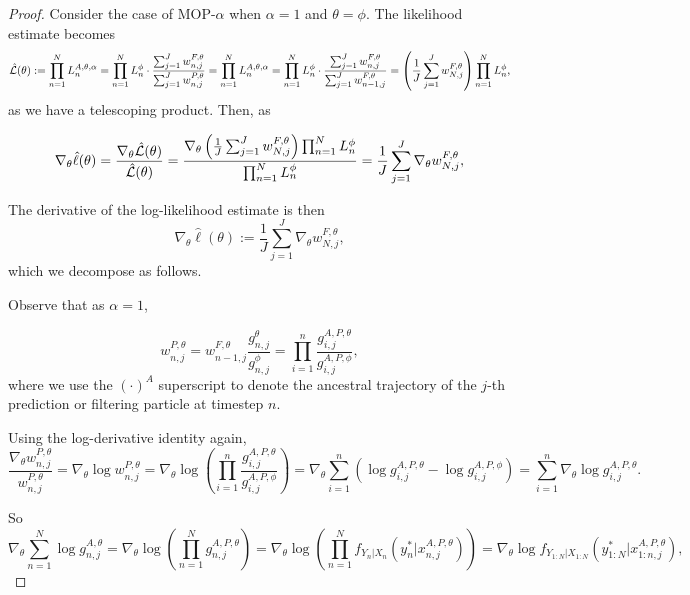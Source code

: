 \documentclass{article}
\begin{document}
\begin{proof}

    Consider the case of MOP-$\alpha$ when $\alpha=1$ and $\theta=\phi$. The likelihood estimate becomes
\begin{equation*}
    \hat{\mathcal{L}}(\theta) := \prod_{n=1}^N L_n^{A, \theta, \alpha} = \prod_{n=1}^N L_n^\phi \cdot \frac{\sum_{j=1}^J w_{n,j}^{F,\theta}}{\sum_{j=1}^J w_{n,j}^{P,\theta}}= \prod_{n=1}^N L_n^{A, \theta, \alpha} = \prod_{n=1}^N L_n^\phi \cdot \frac{\sum_{j=1}^J w_{n,j}^{F,\theta}}{\sum_{j=1}^J w_{n-1,j}^{F,\theta}} = \left(\frac{1}{J}\sum_{j=1}^J w_{N,j}^{F,\theta}\right) \prod_{n=1}^N L_n^\phi,
\end{equation*}
as we have a telescoping product. Then, as

$$\nabla_\theta \hat\ell(\theta) = \frac{\nabla_\theta \hat{\mathcal{L}}(\theta)}{\hat{\mathcal{L}}(\theta)} = \frac{\nabla_\theta\left(\frac{1}{J}\sum_{j=1}^J w_{N,j}^{F,\theta}\right) \prod_{n=1}^N L_n^\phi}{\prod_{n=1}^N L_n^\phi} =  \frac{1}{J}\sum_{j=1}^J \nabla_\theta w_{N,j}^{F,\theta},$$

The derivative of the log-likelihood estimate is then
\begin{equation*}
    \nabla_\theta \hat{\ell}(\theta) := \frac{1}{J}\sum_{j=1}^J \nabla_\theta w_{N,j}^{F,\theta},
\end{equation*}
which we decompose as follows.

Observe that as $\alpha=1$,

$$w_{n,j}^{P,\theta} = w_{n-1,j}^{F,\theta}\frac{g_{n,j}^\theta}{g_{n,j}^\phi} = \prod_{i=1}^n \frac{g_{i,j}^{A,P,\theta}}{g_{i,j}^{A,P,\phi}},$$
where we use the $(\cdot)^A$ superscript to denote the ancestral trajectory of the $j$-th prediction or filtering particle at timestep $n$.

Using the log-derivative identity again,
$$\frac{\nabla_\theta w_{n,j}^{P,\theta}}{w_{n,j}^{P,\theta}} = \nabla_\theta \log w_{n,j}^{P,\theta} = \nabla_\theta \log \left(\prod_{i=1}^n \frac{g_{i,j}^{A,P,\theta}}{g_{i,j}^{A,P,\phi}}\right) = \nabla_\theta \sum_{i=1}^n \left(\log g_{i,j}^{A,P,\theta} - \log g_{i,j}^{A,P,\phi}\right) = \sum_{i=1}^n \nabla_\theta \log g_{i,j}^{A,P,\theta}.$$

So 
$$  \nabla_\theta \sum_{n=1}^N \log g_{n,j}^{A,\theta} = \nabla_\theta \log\left(\prod_{n=1}^N g_{n,j}^{A,P,\theta}\right) =  \nabla_\theta \log\left(\prod_{n=1}^N f_{Y_n|X_n}\left(y_n^* | x_{n,j}^{A, P,\theta}\right)\right) = \nabla_\theta \log f_{Y_{1:N}|X_{1:N}}\left(y_{1:N}^* | x_{1:n,j}^{A, P,\theta}\right),$$


\end{proof}
\end{document}
